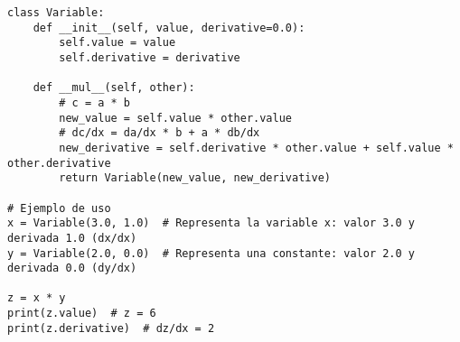 \begin{verbatim}
class Variable:
    def __init__(self, value, derivative=0.0):
        self.value = value
        self.derivative = derivative

    def __mul__(self, other):
        # c = a * b
        new_value = self.value * other.value
        # dc/dx = da/dx * b + a * db/dx
        new_derivative = self.derivative * other.value + self.value * other.derivative
        return Variable(new_value, new_derivative)

# Ejemplo de uso
x = Variable(3.0, 1.0)  # Representa la variable x: valor 3.0 y derivada 1.0 (dx/dx)
y = Variable(2.0, 0.0)  # Representa una constante: valor 2.0 y derivada 0.0 (dy/dx)

z = x * y
print(z.value)  # z = 6
print(z.derivative)  # dz/dx = 2
\end{verbatim}
